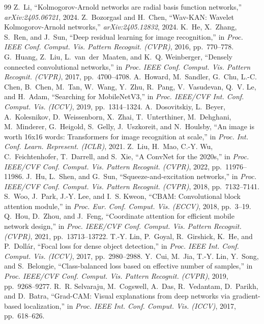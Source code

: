 \documentclass[conference]{IEEEtran}
\begin{document}
\begin{thebibliography}{99}
 Z.~Li, ``Kolmogorov-Arnold networks are radial basis function networks,'' \emph{arXiv:2405.06721}, 2024.
 Z.~Bozorgasl and H.~Chen, ``Wav-KAN: Wavelet Kolmogorov-Arnold networks,'' \emph{arXiv:2405.12832}, 2024.
 K.~He, X.~Zhang, S.~Ren, and J.~Sun, ``Deep residual learning for image recognition,'' in \emph{Proc. IEEE Conf. Comput. Vis. Pattern Recognit. (CVPR)}, 2016, pp.~770--778.
 G.~Huang, Z.~Liu, L.~van~der~Maaten, and K.~Q. Weinberger, ``Densely connected convolutional networks,'' in \emph{Proc. IEEE Conf. Comput. Vis. Pattern Recognit. (CVPR)}, 2017, pp.~4700--4708.
 A.~Howard, M.~Sandler, G.~Chu, L.-C. Chen, B.~Chen, M.~Tan, W.~Wang, Y.~Zhu, R.~Pang, V.~Vasudevan, Q.~V. Le, and H.~Adam, ``Searching for MobileNetV3,'' in \emph{Proc. IEEE/CVF Int. Conf. Comput. Vis. (ICCV)}, 2019, pp.~1314--1324.
 A.~Dosovitskiy, L.~Beyer, A.~Kolesnikov, D.~Weissenborn, X.~Zhai, T.~Unterthiner, M.~Dehghani, M.~Minderer, G.~Heigold, S.~Gelly, J.~Uszkoreit, and N.~Houlsby, ``An image is worth 16x16 words: Transformers for image recognition at scale,'' in \emph{Proc. Int. Conf. Learn. Represent. (ICLR)}, 2021.
 Z.~Liu, H.~Mao, C.-Y. Wu, C.~Feichtenhofer, T.~Darrell, and S.~Xie, ``A ConvNet for the 2020s,'' in \emph{Proc. IEEE/CVF Conf. Comput. Vis. Pattern Recognit. (CVPR)}, 2022, pp.~11976--11986.
 J.~Hu, L.~Shen, and G.~Sun, ``Squeeze-and-excitation networks,'' in \emph{Proc. IEEE/CVF Conf. Comput. Vis. Pattern Recognit. (CVPR)}, 2018, pp.~7132--7141.
 S.~Woo, J.~Park, J.-Y. Lee, and I.~S. Kweon, ``CBAM: Convolutional block attention module,'' in \emph{Proc. Eur. Conf. Comput. Vis. (ECCV)}, 2018, pp.~3--19.
 Q.~Hou, D.~Zhou, and J.~Feng, ``Coordinate attention for efficient mobile network design,'' in \emph{Proc. IEEE/CVF Conf. Comput. Vis. Pattern Recognit. (CVPR)}, 2021, pp.~13713--13722.
 T.-Y. Lin, P.~Goyal, R.~Girshick, K.~He, and P.~Doll\'{a}r, ``Focal loss for dense object detection,'' in \emph{Proc. IEEE Int. Conf. Comput. Vis. (ICCV)}, 2017, pp.~2980--2988.
 Y.~Cui, M.~Jia, T.-Y. Lin, Y.~Song, and S.~Belongie, ``Class-balanced loss based on effective number of samples,'' in \emph{Proc. IEEE/CVF Conf. Comput. Vis. Pattern Recognit. (CVPR)}, 2019, pp.~9268--9277.
 R.~R. Selvaraju, M.~Cogswell, A.~Das, R.~Vedantam, D.~Parikh, and D.~Batra, ``Grad-CAM: Visual explanations from deep networks via gradient-based localization,'' in \emph{Proc. IEEE Int. Conf. Comput. Vis. (ICCV)}, 2017, pp.~618--626.

\end{thebibliography}
\end{document}
